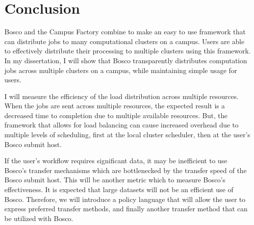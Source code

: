 \section{Conclusion}

Bosco and the Campus Factory combine to make an easy to use framework that can distribute jobs to many computational clusters on a campus.  Users are able to effectively distribute their processing to multiple clusters using this framework.  In my dissertation, I will show that Bosco transparently distributes computation jobs across multiple clusters on a campus, while maintaining simple usage for users.

I will measure the efficiency of the load distribution across multiple resources.  When the jobs are sent across multiple resources, the expected result is a decreased time to completion due to multiple available resources.  But, the framework that allows for load balancing can cause increased overhead due to multiple levels of scheduling, first at the local cluster scheduler, then at the user's Bosco submit host.

If the user's workflow requires significant data, it may be inefficient to use Bosco's transfer mechanisms which are bottlenecked by the transfer speed of the Bosco submit host.  This will be another metric which to measure Bosco's effectiveness.  It is expected that large datasets will not be an efficient use of Bosco.  Therefore, we will introduce a policy language that will allow the user to express preferred transfer methods, and finally another transfer method that can be utilized with Bosco.



